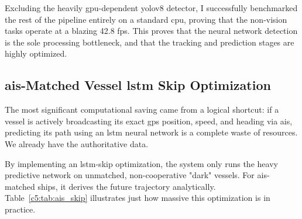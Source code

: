 Excluding the heavily \gls{gpu}-dependent \gls{yolov8} detector, I successfully benchmarked the rest of the pipeline entirely on a standard \gls{cpu}, proving that the non-vision tasks operate at a blazing 42.8 fps. This proves that the neural network detection is the sole processing bottleneck, and that the tracking and prediction stages are highly optimized.

\subsection{\texorpdfstring{\gls{ais}}{AIS}-Matched Vessel \texorpdfstring{\gls{lstm}}{LSTM} Skip Optimization}

The most significant computational saving came from a logical shortcut: if a vessel is actively broadcasting its exact \gls{gps} position, speed, and heading via \gls{ais}, predicting its path using an \gls{lstm} neural network is a complete waste of resources. We already have the authoritative data.

By implementing an \gls{lstm}-skip optimization, the system only runs the heavy predictive network on unmatched, non-cooperative "dark" vessels. For \gls{ais}-matched ships, it derives the future trajectory analytically. Table~\ref{c5:tab:ais_skip} illustrates just how massive this optimization is in practice.

\begin{table}[H]
\fontsize{10}{12}\selectfont
\centering
\caption{Measured Compute Saving from \gls{ais}-Matched \gls{lstm} Skip Optimization (6 vessels/frame, 300 iterations)}
\label{c5:tab:ais_skip}
\end{table}

